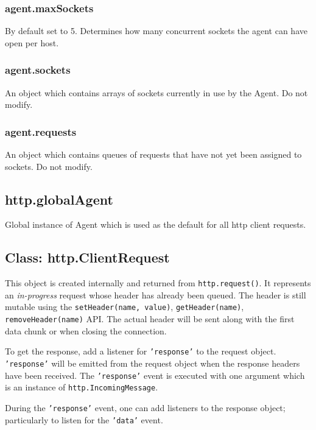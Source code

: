 \subsubsection{agent.maxSockets}

By default set to 5. Determines how many concurrent sockets the agent
can have open per host.

\subsubsection{agent.sockets}

An object which contains arrays of sockets currently in use by the
Agent. Do not modify.

\subsubsection{agent.requests}

An object which contains queues of requests that have not yet been
assigned to sockets. Do not modify.

\subsection{http.globalAgent}

Global instance of Agent which is used as the default for all http
client requests.

\subsection{Class: http.ClientRequest}

This object is created internally and returned from
\texttt{http.request()}. It represents an \emph{in-progress} request
whose header has already been queued. The header is still mutable using
the \texttt{setHeader(name, value)}, \texttt{getHeader(name)},
\texttt{removeHeader(name)} API. The actual header will be sent along
with the first data chunk or when closing the connection.

To get the response, add a listener for \texttt{'response'} to the
request object. \texttt{'response'} will be emitted from the request
object when the response headers have been received. The
\texttt{'response'} event is executed with one argument which is an
instance of \texttt{http.IncomingMessage}.

During the \texttt{'response'} event, one can add listeners to the
response object; particularly to listen for the \texttt{'data'} event.

